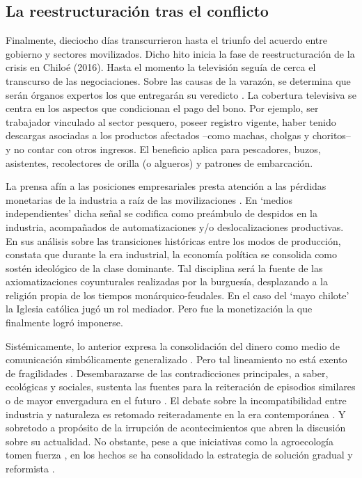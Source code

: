 \documentclass{textolivre}
\begin{document}
\subsection{La reestructuración tras el conflicto}\label{sec-reestr-conflicto}

Finalmente, dieciocho días transcurrieron hasta el triunfo del acuerdo entre
gobierno y sectores movilizados. Dicho hito inicia la fase de reestructuración de la crisis
en Chiloé (2016). Hasta el momento la televisión seguía de cerca el transcurso de las
negociaciones. Sobre las causas de la varazón, se determina que serán órganos expertos
los que entregarán su veredicto \cite{24horasb}. La cobertura televisiva se centra en
los aspectos que condicionan el pago del bono. Por ejemplo, ser trabajador vinculado al
sector pesquero, poseer registro vigente, haber tenido descargas asociadas a los
productos afectados --como machas, cholgas y choritos-- y no contar con otros
ingresos. El beneficio aplica para pescadores, buzos, asistentes, recolectores de orilla (o
algueros) y patrones de embarcación.

La prensa afín a las posiciones empresariales presta atención a las pérdidas
monetarias de la industria a raíz de las movilizaciones \cite{emol,salmonexpert}.
En ‘medios independientes’ dicha señal se codifica como preámbulo de despidos
en la industria, acompañados de automatizaciones y/o deslocalizaciones productivas. En
sus análisis sobre las transiciones históricas entre los modos de producción, \textcite{marx2010}
constata que durante la era industrial, la economía política se consolida como sostén
ideológico de la clase dominante. Tal disciplina será la fuente de las axiomatizaciones
coyunturales realizadas por la burguesía, desplazando a la religión propia de los tiempos
monárquico-feudales. En el caso del ‘mayo chilote’ la Iglesia católica jugó un rol mediador.
Pero fue la monetización la que finalmente logró imponerse.

Sistémicamente, lo anterior expresa la consolidación del dinero como medio de
comunicación simbólicamente generalizado \cite{becerra2013,Luhmann1991}.
Pero tal lineamiento no está exento de fragilidades \cite{Habermas2006}.
Desembarazarse de las contradicciones principales, a saber, ecológicas y sociales,
sustenta las fuentes para la reiteración de episodios similares o de mayor envergadura en
el futuro \cite{Folke2016,greenpeace}. El debate sobre la incompatibilidad entre
industria y naturaleza es retomado reiteradamente en la era contemporánea \cite{ciudadano2016,Foster2016}.
Y sobretodo a propósito de la irrupción de
acontecimientos que abren la discusión sobre su actualidad. No obstante, pese a que
iniciativas como la agroecología tomen fuerza \cite{arboleda}, en los hechos se ha
consolidado la estrategia de solución gradual y reformista \cite{rios2016}.
\end{document}
